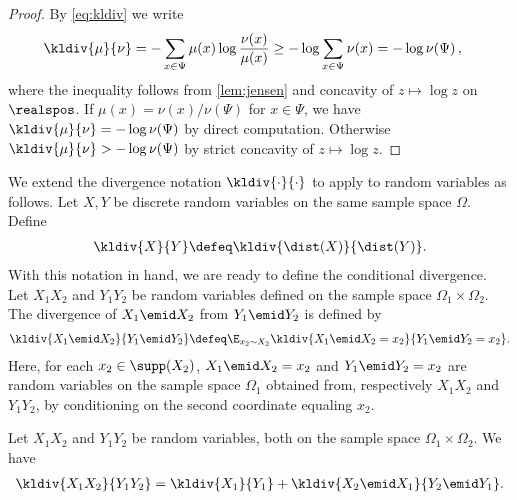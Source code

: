 \begin{proof}
By \autoref{eq:kldiv} we write
\begin{align*}
\kldiv{\mu}{\nu} &= -\sum_{x\in \Psi}
    \mu(x)\log\frac{\nu(x)}{\mu(x)}
  \ge -\log\sum_{x\in \Psi}\nu(x) =-\log \nu(\Psi)\,,
\end{align*}
where the inequality follows from
\autoref{lem:jensen} and concavity of
$z\mapsto\log z$ on $\realspos$. 
If $\mu(x) = \nu(x)/\nu(\Psi)$ for $x\in\Psi$, we have 
$\kldiv{\mu}{\nu}=-\log \nu(\Psi)$ by direct computation.
Otherwise $\kldiv{\mu}{\nu}>-\log\nu(\Psi)$ by strict 
concavity of $z\mapsto\log z$.
\end{proof}

We extend the divergence notation
$\kldiv{\cdot}{\cdot}$ to apply to random
variables as follows. Let $X,Y$ be discrete random
variables on the same sample space $\Omega$. Define
\begin{align}
\label{eq:klrv}
\kldiv{X}{Y}\defeq \kldiv{\dist(X)}{\dist(Y)}.
\end{align}
%
With this notation in hand, we are ready to define the 
conditional divergence. Let $X_1X_2$ and $Y_1Y_2$ be 
random variables defined on the sample space $\Omega_1\times \Omega_2$.
The divergence of $X_1\emid X_2$ from $Y_1\emid Y_2$ is
defined by 
\begin{align}
\kldiv{X_1\emid X_2}{Y_1\emid Y_2}
    \defeq \E_{x_2\sim X_2}
        \kldiv{X_1\emid X_2=x_2}{Y_1\emid Y_2 = x_2}.
\end{align}
Here, for each $x_2\in\supp(X_2)$, 
$X_1\emid X_2=x_2$ and $Y_1\emid Y_2 = x_2$ 
are random variables on the sample space
$\Omega_1$ obtained from, respectively
$X_1X_2$ and $Y_1Y_2$, by conditioning on the
second coordinate equaling $x_2$.
\begin{lemma}
\label{lem:klchain}
Let $X_1X_2$ and $Y_1Y_2$ be random variables, both on the
sample space $\Omega_1\times \Omega_2$. We have
\begin{align*}
\kldiv{X_1X_2}{Y_1Y_2} = 
    \kldiv{X_1}{Y_1} + \kldiv{X_2\emid X_1}{Y_2\emid Y_1}.
\end{align*}
\end{lemma}

